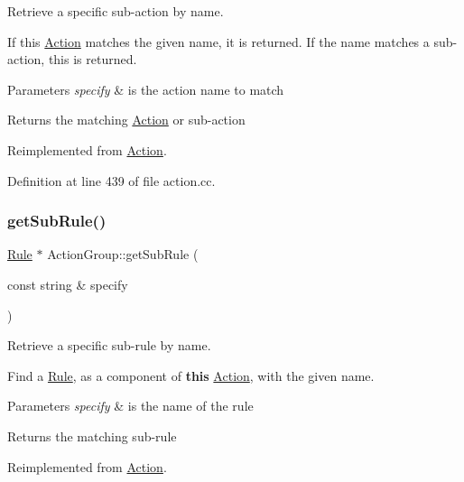 Retrieve a specific sub-\/action by name. 

If this \mbox{\hyperlink{class_action}{Action}} matches the given name, it is returned. If the name matches a sub-\/action, this is returned. 
\begin{DoxyParams}{Parameters}
{\em specify} & is the action name to match \\
\hline
\end{DoxyParams}
\begin{DoxyReturn}{Returns}
the matching \mbox{\hyperlink{class_action}{Action}} or sub-\/action 
\end{DoxyReturn}


Reimplemented from \mbox{\hyperlink{class_action_ad7c260f28ff9705265558c3c077b9792}{Action}}.



Definition at line 439 of file action.\+cc.

\mbox{\label{class_action_group_acf178e5772a5fba9fb8f11e8dadba126}} 
\subsubsection{\texorpdfstring{getSubRule()}{getSubRule()}}
{\footnotesize\ttfamily \mbox{\hyperlink{class_rule}{Rule}} $\ast$ Action\+Group\+::get\+Sub\+Rule (\begin{DoxyParamCaption}\item[{const string \&}]{specify }\end{DoxyParamCaption})\hspace{0.3cm}{\ttfamily [virtual]}}



Retrieve a specific sub-\/rule by name. 

Find a \mbox{\hyperlink{class_rule}{Rule}}, as a component of {\bfseries{this}} \mbox{\hyperlink{class_action}{Action}}, with the given name. 
\begin{DoxyParams}{Parameters}
{\em specify} & is the name of the rule \\
\hline
\end{DoxyParams}
\begin{DoxyReturn}{Returns}
the matching sub-\/rule 
\end{DoxyReturn}


Reimplemented from \mbox{\hyperlink{class_action_aacd1f960b27f1b02d27a49aaa61c895a}{Action}}.



